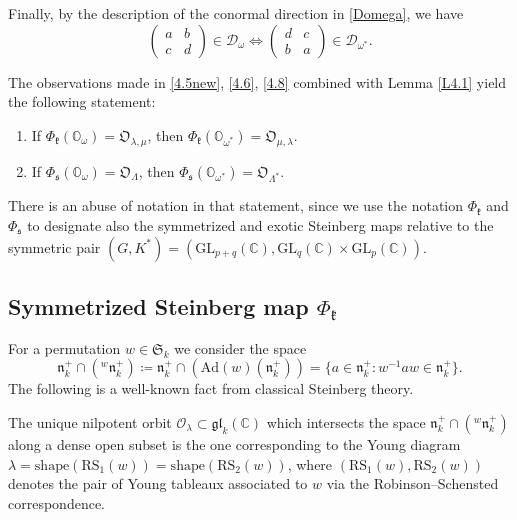 \documentclass[ALCO,Unicode]{cedram}
\newcommand{\fk}{\mathfrak{k}}
\newcommand{\fs}{\mathfrak{s}}
\newcommand{\fn}{\mathfrak{n}}
\newcommand{\gl}{\mathfrak{gl}}
\newcommand{\RS}{\mathrm{RS}}
\newcommand{\shape}{\mathrm{shape}}
\newcommand{\Xorbit}{\mathbb{O}}
\newcommand{\Nkorbit}{\mathfrak{O}}
\newcommand{\Nsorbit}{\mathfrak{O}}
\newcommand{\condir}{\mathcal{D}}
\newcommand{\permutationsof}[1]{\mathfrak{S}_{#1}}
\newcommand{\GL}{\mathrm{GL}}
\newcommand{\mC}{\mathbb{C}}
\begin{document}
Finally, by the description of the conormal direction in \eqref{Domega}, we have
\begin{equation}
\label{4.8}
\begin{pmatrix} a & b\\ c & d \end{pmatrix}\in\condir_\omega\Longleftrightarrow
\begin{pmatrix} d & c\\ b & a \end{pmatrix}\in\condir_{\omega^*}.
\end{equation}

The observations made in \eqref{4.5new}, \eqref{4.6}, \eqref{4.8} combined with Lemma \ref{L4.1} yield the following statement:

\begin{lemma}
\label{L4.3}
\begin{enumerate}
\item If $\Phi_\fk(\Xorbit_\omega)=\Nkorbit_{\lambda,\mu}$, then $\Phi_\fk(\Xorbit_{\omega^*})=\Nkorbit_{\mu,\lambda}$.
\item If $\Phi_\fs(\Xorbit_\omega)=\Nsorbit_\Lambda$, then $\Phi_\fs(\Xorbit_{\omega^*})=\Nsorbit_{\Lambda^*}$.
\end{enumerate}
\end{lemma}

There is an abuse of notation in that statement, since we use the notation $\Phi_\fk$ and $\Phi_\fs$ to designate also the symmetrized and exotic Steinberg maps relative to the symmetric pair $(G,K^*)=(\GL_{p+q}(\mC),\GL_q(\mC)\times\GL_p(\mC))$.

\subsection{Symmetrized Steinberg map $\Phi_\fk$}

For a permutation $w\in\permutationsof{k}$ we consider the space
\[
\fn_k^+\cap({}^w\fn_k^+)\coloneqq \fn_k^+\cap(\mathrm{Ad}(w)(\fn_k^+))=\{a\in\fn_k^+:w^{-1}aw\in\fn_k^+\}.
\]
The following is a well-known fact from classical Steinberg theory.

\begin{theorem}
\label{T-Steinberg}
The unique nilpotent orbit $\mathcal{O}_\lambda\subset \gl_k(\mC)$ which intersects the space $\fn_k^+\cap({}^w\fn_k^+)$ along a dense open subset is the one corresponding to the Young diagram
$\lambda=\shape(\RS_1(w))=\shape(\RS_2(w))$, where $(\RS_1(w),\RS_2(w))$ denotes the pair of Young tableaux associated to $w$ via the Robinson--Schensted correspondence.
\end{theorem}
\end{document}
